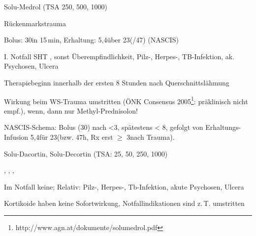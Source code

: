{\begin{MedikamentCharakteristika}
  \item[{\TxItemSpezialitaeten}] Solu-Medrol{\texttrademark} (TSA 
  250, 500, 1000\Mg*)
  \item[{\TxItemIndikation}] 
  \item[{\TxItemKontraindikation}] Rückenmarkstrauma

  \item[{\TxItemDosierung}] 
  Bolus: 			30\MgKg* in 15\,min, 
  Erhaltung: 	5,4\MgKgH über 23\Hour*(/47\Hour*) (NASCIS)

  \item[{\TxItemKontraindikation}]  I. Notfall SHT%
, sonst Überempfindlichkeit, Pilz-, Herpes-, TB-Infektion, ak.
Psychosen, Ulcera

Therapiebeginn innerhalb der ersten 8 Stunden nach Querschnittslähmung

Wirkung beim WS-Trauma umstritten (ÖNK Consensus
2005\footnote{http://www.agn.at/dokumente/solumedrol.pdf}:  
präklinisch nicht
empf.), wenn, dann nur Methyl-Prednisolon!

NASCIS-Schema: Bolus (30\MgKg) nach {\textless}3\Hour*, spätestens
{\textless} 8\Hour*, gefolgt von Erhaltungs-Infusion 5,4\MgKgH für
23\Hour* (bzw. 47h, Rx erst ${\geq}$ 3\Hour* nach Trauma).


\end{MedikamentCharakteristika}}
{}






{
\begin{MedikamentCharakteristika}
  \item[{\TxItemSpezialitaeten}] 
  Solu-Dacortin{\texttrademark}, 
  Solu-Decortin{\texttrademark} (TSA: 25, 50, 250, 1000\Mg*)
  \item[{\TxItemBeschreibung}]
  \item[{\TxItemIndikation}]
  \item[{\TxItemKontraindikation}]
  \item[{\TxItemDosierung}]
     \Mg,
     \Mg,
     \Gramm*, 
     \Gramm*
  \item[{\TxItemKontraindikation}]  Im Notfall keine; 
  Relativ: Pilz-, Herpes-, Tb-Infektion,
  akute Psychosen, 
  Ulcera
  \item[{\TxItemAnmerkung}] 
  Kortikoide haben keine Sofortwirkung, 
  Notfallindikationen sind z.\,T. umstritten
\end{MedikamentCharakteristika}}
{}


